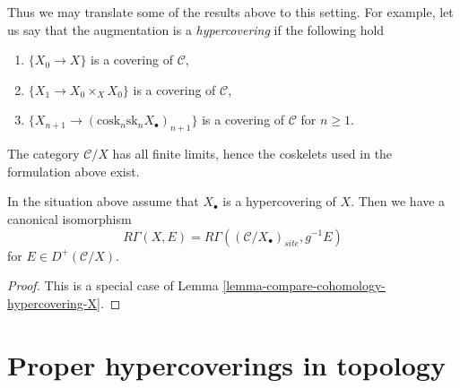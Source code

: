 \medskip\noindent
Thus we may translate some of the results above to this setting.
For example, let us say that the augmentation is a {\it hypercovering}
if the following hold
\begin{enumerate}
\item $\{X_0 \to X\}$ is a covering of $\mathcal{C}$,
\item $\{X_1 \to X_0 \times_X X_0\}$ is a covering of $\mathcal{C}$,
\item $\{X_{n + 1} \to (\text{cosk}_n\text{sk}_n X_\bullet)_{n + 1}\}$
is a covering of $\mathcal{C}$ for $n \geq 1$.
\end{enumerate}
The category $\mathcal{C}/X$ has all finite limits, hence the
coskelets used in the formulation above exist.

\begin{lemma}
\label{lemma-compare-cohomology-hypercovering-X-simple}
In the situation above assume that $X_\bullet$ is a hypercovering of $X$.
Then we have a canonical isomorphism
$$
R\Gamma(X, E) = R\Gamma((\mathcal{C}/X_\bullet)_{site}, g^{-1}E)
$$
for $E \in D^+(\mathcal{C}/X)$.
\end{lemma}

\begin{proof}
This is a special case of
Lemma \ref{lemma-compare-cohomology-hypercovering-X}.
\end{proof}








\section{Proper hypercoverings in topology}
\label{section-proper-hypercovering}

